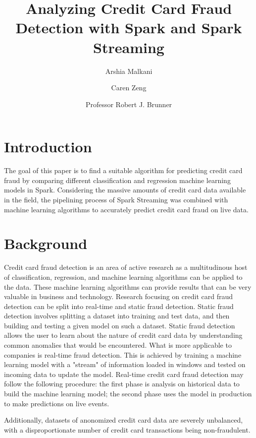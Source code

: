 \documentclass[9pt,twocolumn,twoside]{idsi}
\author[1]{Arshia Malkani}
\author[1]{Caren Zeng}
\author[2]{Professor Robert J. Brunner}
\affil[1]{National Center For Supercomputing Applications (NCSA)}
\affil[2]{Laboratory for Computation, Data, and Machine Learning}
\title{Analyzing Credit Card Fraud Detection with Spark and Spark Streaming}
\begin{document}

\maketitle

\section{Introduction}
The goal of this paper is to find a suitable algorithm for predicting credit card fraud by comparing different classification and regression machine learning models in Spark. Considering the massive amounts of credit card data available in the field, the pipelining process of Spark Streaming was combined with machine learning algorithms to accurately predict credit card fraud on live data. 
\section{Background}
Credit card fraud detection is an area of active research as a multitudinous host of classification, regression, and machine learning algorithms can be applied to the data. These machine learning algorithms can provide results that can be very valuable in business and technology. Research focusing on credit card fraud detection can be split into real-time and static fraud detection. Static fraud detection involves splitting a dataset into training and test data, and then building and testing a given model on such a dataset. Static fraud detection allows the user to learn about the nature of credit card data by understanding common anomalies that would be encountered. What is more applicable to companies is real-time fraud detection. This is achieved by training a machine learning model with a "stream" of information loaded in windows and tested on incoming data to update the model. Real-time credit card fraud detection may follow the following procedure:
the first phase is analysis on historical data to build the machine learning model; the second phase uses the model in production to make predictions on live events. \cite{creditcardfraud}



Additionally, datasets of anonomized credit card data are severely unbalanced, with a disproportionate number of credit card transactions being non-fraudulent. 
\end{document}
